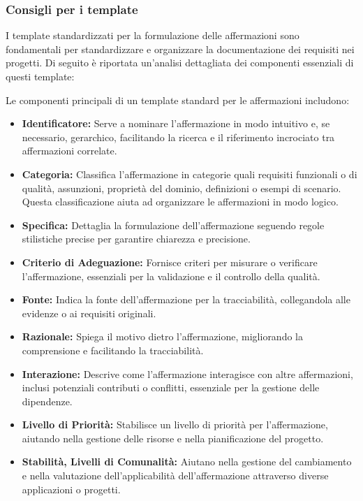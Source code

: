 \subsubsection{Consigli per i template}
I template standardizzati per la formulazione delle affermazioni sono fondamentali per standardizzare e organizzare la documentazione dei requisiti nei progetti. Di seguito è riportata un'analisi dettagliata dei componenti essenziali di questi template:

Le componenti principali di un template standard per le affermazioni includono:

\begin{itemize}
    \item \textbf{Identificatore:} Serve a nominare l'affermazione in modo intuitivo e, se necessario, gerarchico, facilitando la ricerca e il riferimento incrociato tra affermazioni correlate.
    \item \textbf{Categoria:} Classifica l'affermazione in categorie quali requisiti funzionali o di qualità, assunzioni, proprietà del dominio, definizioni o esempi di scenario. Questa classificazione aiuta ad organizzare le affermazioni in modo logico.
    \item \textbf{Specifica:} Dettaglia la formulazione dell'affermazione seguendo regole stilistiche precise per garantire chiarezza e precisione.
    \item \textbf{Criterio di Adeguazione:} Fornisce criteri per misurare o verificare l'affermazione, essenziali per la validazione e il controllo della qualità.
    \item \textbf{Fonte:} Indica la fonte dell'affermazione per la tracciabilità, collegandola alle evidenze o ai requisiti originali.
    \item \textbf{Razionale:} Spiega il motivo dietro l'affermazione, migliorando la comprensione e facilitando la tracciabilità.
    \item \textbf{Interazione:} Descrive come l'affermazione interagisce con altre affermazioni, inclusi potenziali contributi o conflitti, essenziale per la gestione delle dipendenze.
    \item \textbf{Livello di Priorità:} Stabilisce un livello di priorità per l'affermazione, aiutando nella gestione delle risorse e nella pianificazione del progetto.
    \item \textbf{Stabilità, Livelli di Comunalità:} Aiutano nella gestione del cambiamento e nella valutazione dell'applicabilità dell'affermazione attraverso diverse applicazioni o progetti.
\end{itemize}
